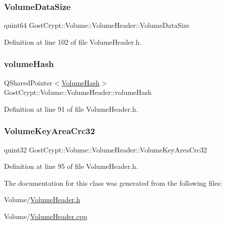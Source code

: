 \subsubsection{\texorpdfstring{Volume\+Data\+Size}{VolumeDataSize}}
{\footnotesize\ttfamily quint64 Gost\+Crypt\+::\+Volume\+::\+Volume\+Header\+::\+Volume\+Data\+Size\hspace{0.3cm}{\ttfamily [protected]}}



Definition at line 102 of file Volume\+Header.\+h.

\mbox{\label{class_gost_crypt_1_1_volume_1_1_volume_header_a2c7ee26744636f1f262d28dc0f2e13a7}} 
\subsubsection{\texorpdfstring{volume\+Hash}{volumeHash}}
{\footnotesize\ttfamily Q\+Shared\+Pointer$<$\hyperlink{class_gost_crypt_1_1_volume_1_1_volume_hash}{Volume\+Hash}$>$ Gost\+Crypt\+::\+Volume\+::\+Volume\+Header\+::volume\+Hash\hspace{0.3cm}{\ttfamily [protected]}}



Definition at line 91 of file Volume\+Header.\+h.

\mbox{\label{class_gost_crypt_1_1_volume_1_1_volume_header_a32c984961780c9bb1a4bbfa695e46b19}} 
\subsubsection{\texorpdfstring{Volume\+Key\+Area\+Crc32}{VolumeKeyAreaCrc32}}
{\footnotesize\ttfamily quint32 Gost\+Crypt\+::\+Volume\+::\+Volume\+Header\+::\+Volume\+Key\+Area\+Crc32\hspace{0.3cm}{\ttfamily [protected]}}



Definition at line 95 of file Volume\+Header.\+h.



The documentation for this class was generated from the following files\+:\begin{DoxyCompactItemize}
\item 
Volume/\hyperlink{_volume_header_8h}{Volume\+Header.\+h}\item 
Volume/\hyperlink{_volume_header_8cpp}{Volume\+Header.\+cpp}\end{DoxyCompactItemize}
